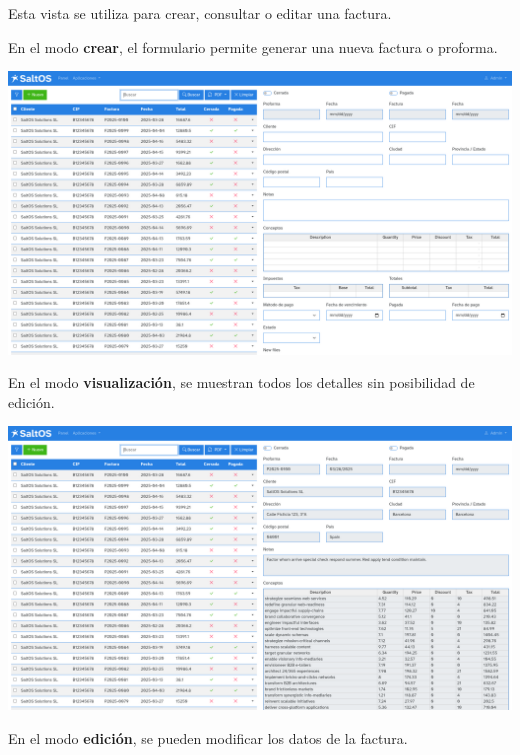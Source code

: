 \documentclass[a4paper]{article}
\begin{document}
Esta vista se utiliza para crear, consultar o editar una factura.

En el modo \textbf{crear}, el formulario permite generar una nueva factura o proforma.

\begin{center}\includegraphics[width=1\textwidth]{../ujest/snaps/test-screenshots-js-screenshots-sales-invoices-create-es-es-1-snap.png}\end{center}

En el modo \textbf{visualización}, se muestran todos los detalles sin posibilidad de edición.

\begin{center}\includegraphics[width=1\textwidth]{../ujest/snaps/test-screenshots-js-screenshots-sales-invoices-view-100-es-es-1-snap.png}\end{center}

En el modo \textbf{edición}, se pueden modificar los datos de la factura.
\end{document}

